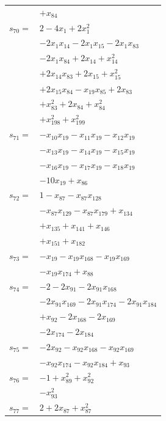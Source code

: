 \begin{longtable}{@{}r@{\;}l@{}}
 & \(\displaystyle +x_{84}\) \\[3pt]
\(s_{70}=\) & \(\displaystyle 2 -4x_{1} +2x_{1}^{2}\) \\
 & \(\displaystyle -2x_{1}x_{14} -2x_{1}x_{15} -2x_{1}x_{83}\) \\
 & \(\displaystyle -2x_{1}x_{84} +2x_{14} +x_{14}^{2}\) \\
 & \(\displaystyle +2x_{14}x_{83} +2x_{15} +x_{15}^{2}\) \\
 & \(\displaystyle +2x_{15}x_{84} -x_{19}x_{85} +2x_{83}\) \\
 & \(\displaystyle +x_{83}^{2} +2x_{84} +x_{84}^{2}\) \\
 & \(\displaystyle +x_{198}^{2} +x_{199}^{2}\) \\[3pt]
\(s_{71}=\) & \(\displaystyle -x_{10}x_{19} -x_{11}x_{19} -x_{12}x_{19}\) \\
 & \(\displaystyle -x_{13}x_{19} -x_{14}x_{19} -x_{15}x_{19}\) \\
 & \(\displaystyle -x_{16}x_{19} -x_{17}x_{19} -x_{18}x_{19}\) \\
 & \(\displaystyle -10x_{19} +x_{86}\) \\[3pt]
\(s_{72}=\) & \(\displaystyle 1 -x_{87} -x_{87}x_{128}\) \\
 & \(\displaystyle -x_{87}x_{129} -x_{87}x_{179} +x_{134}\) \\
 & \(\displaystyle +x_{135} +x_{141} +x_{146}\) \\
 & \(\displaystyle +x_{151} +x_{182}\) \\[3pt]
\(s_{73}=\) & \(\displaystyle -x_{19} -x_{19}x_{168} -x_{19}x_{169}\) \\
 & \(\displaystyle -x_{19}x_{174} +x_{88}\) \\[3pt]
\(s_{74}=\) & \(\displaystyle -2 -2x_{91} -2x_{91}x_{168}\) \\
 & \(\displaystyle -2x_{91}x_{169} -2x_{91}x_{174} -2x_{91}x_{184}\) \\
 & \(\displaystyle +x_{92} -2x_{168} -2x_{169}\) \\
 & \(\displaystyle -2x_{174} -2x_{184}\) \\[3pt]
\(s_{75}=\) & \(\displaystyle -2x_{92} -x_{92}x_{168} -x_{92}x_{169}\) \\
 & \(\displaystyle -x_{92}x_{174} -x_{92}x_{184} +x_{93}\) \\[3pt]
\(s_{76}=\) & \(\displaystyle -1 +x_{89}^{2} +x_{92}^{2}\) \\
 & \(\displaystyle -x_{93}^{2}\) \\[3pt]
\(s_{77}=\) & \(\displaystyle 2 +2x_{87} +x_{87}^{2}\) \\

\end{longtable}
